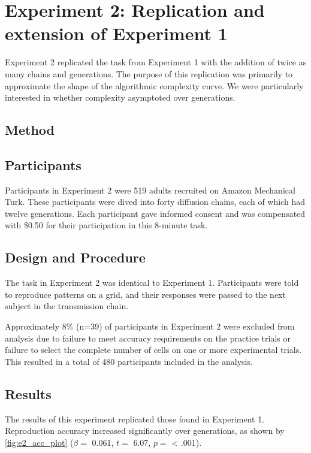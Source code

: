 \documentclass[10pt, letterpaper]{article}
\begin{document}
\section{Experiment 2: Replication and extension of Experiment
1}\label{experiment-2-replication-and-extension-of-experiment-1}

Experiment 2 replicated the task from Experiment 1 with the addition of
twice as many chains and generations. The purpose of this replication
was primarily to approximate the shape of the algorithmic complexity
curve. We were particularly interested in whether complexity asymptoted
over generations.

\subsection{Method}\label{method-1}

\subsection{Participants}\label{participants-1}

Participants in Experiment 2 were 519 adults recruited on Amazon
Mechanical Turk. These participants were dived into forty diffusion
chains, each of which had twelve generations. Each participant gave
informed consent and was compensated with \$0.50 for their participation
in this 8-minute task.

\subsection{Design and Procedure}\label{design-and-procedure-1}

The task in Experiment 2 was identical to Experiment 1. Participants
were told to reproduce patterns on a grid, and their responses were
passed to the next subject in the transmission chain.

Approximately 8\% (n=39) of participants in Experiment 2 were excluded
from analysis due to failure to meet accuracy requirements on the
practice trials or failure to select the complete number of cells on one
or more experimental trials. This resulted in a total of 480
participants included in the analysis.

\subsection{Results}\label{results-1}

The results of this experiment replicated those found in Experiment 1.
Reproduction accuracy increased significantly over generations, as shown
by \ref{fig:e2_acc_plot} (\(\beta =\) 0.061, \(t =\) 6.07, \(p =\)
\textless{} .001).
\end{document}
